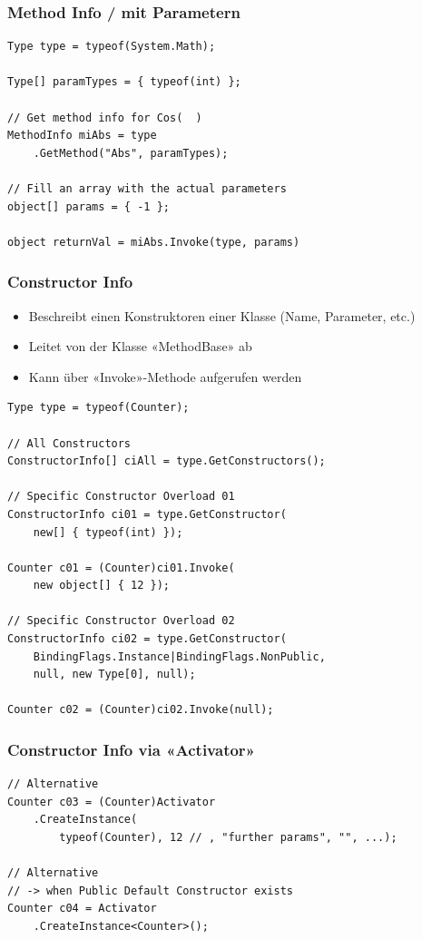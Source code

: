 \subsubsection{Method Info / mit Parametern}
\begin{lstlisting}
Type type = typeof(System.Math);

Type[] paramTypes = { typeof(int) };

// Get method info for Cos(  )
MethodInfo miAbs = type
    .GetMethod("Abs", paramTypes);

// Fill an array with the actual parameters
object[] params = { -1 };

object returnVal = miAbs.Invoke(type, params)
\end{lstlisting}

\subsubsection{Constructor Info}
\begin{itemize}
    \item Beschreibt einen Konstruktoren einer Klasse (Name, Parameter, etc.)
    \item Leitet von der Klasse «MethodBase» ab
    \item Kann über «Invoke»-Methode aufgerufen werden
\end{itemize}
\begin{lstlisting}
Type type = typeof(Counter);

// All Constructors
ConstructorInfo[] ciAll = type.GetConstructors();

// Specific Constructor Overload 01
ConstructorInfo ci01 = type.GetConstructor(
    new[] { typeof(int) });

Counter c01 = (Counter)ci01.Invoke(
    new object[] { 12 });

// Specific Constructor Overload 02
ConstructorInfo ci02 = type.GetConstructor(
    BindingFlags.Instance|BindingFlags.NonPublic,
    null, new Type[0], null);

Counter c02 = (Counter)ci02.Invoke(null);
\end{lstlisting}

\subsubsection{Constructor Info via «Activator»}
\begin{lstlisting}
// Alternative
Counter c03 = (Counter)Activator
    .CreateInstance(
        typeof(Counter), 12 // , "further params", "", ...);

// Alternative
// -> when Public Default Constructor exists
Counter c04 = Activator
    .CreateInstance<Counter>();
\end{lstlisting}
